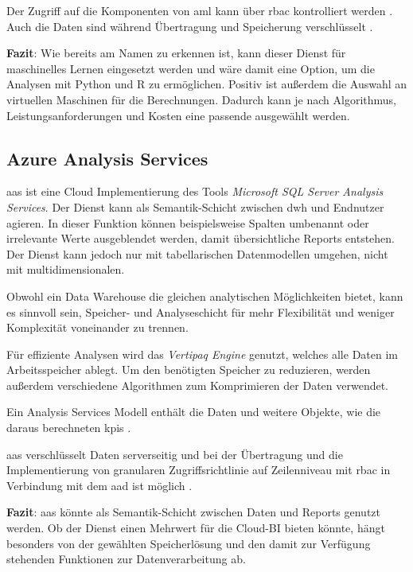 Der Zugriff auf die Komponenten von \ac{aml} kann über \ac{rbac} kontrolliert werden \cite{wu_manage_2021}. Auch die Daten sind während Übertragung und Speicherung verschlüsselt \cite{hirono_data_2021}.

\textbf{Fazit}: Wie bereits am Namen zu erkennen ist, kann dieser Dienst für maschinelles Lernen eingesetzt werden und wäre damit eine Option, um die Analysen mit Python und R zu ermöglichen. Positiv ist außerdem die Auswahl an virtuellen Maschinen für die Berechnungen. Dadurch kann je nach Algorithmus, Leistungsanforderungen und Kosten eine passende ausgewählt werden. 

\subsection{Azure Analysis Services} \label{sec:grundlagen:azure_dienste:analysisServices}
\ac{aas} ist eine Cloud Implementierung des Tools \textit{Microsoft SQL Server Analysis Services}. Der Dienst kann als Semantik-Schicht zwischen \ac{dwh} und Endnutzer agieren. In dieser Funktion können beispielsweise Spalten umbenannt oder irrelevante Werte ausgeblendet werden, damit übersichtliche Reports entstehen. Der Dienst kann jedoch nur mit tabellarischen Datenmodellen umgehen, nicht mit multidimensionalen.

Obwohl ein Data Warehouse die gleichen analytischen Möglichkeiten bietet, kann es sinnvoll sein, Speicher- und Analyseschicht für mehr Flexibilität und weniger Komplexität voneinander zu trennen.

Für effiziente Analysen wird das \textit{Vertipaq Engine} genutzt, welches alle Daten im Arbeitsspeicher ablegt. Um den benötigten Speicher zu reduzieren, werden außerdem verschiedene Algorithmen zum Komprimieren der Daten verwendet.

Ein Analysis Services Modell enthält die Daten und weitere Objekte, wie die daraus berechneten \acp{kpi} \cite{how_beyond_2020}.

\ac{aas} verschlüsselt Daten serverseitig und bei der Übertragung und die Implementierung von granularen Zugriffsrichtlinie auf Zeilenniveau mit \ac{rbac} in Verbindung mit dem \ac{aad} ist möglich \cite{duncan_what_2021}.

\textbf{Fazit}: \ac{aas} könnte als Semantik-Schicht zwischen Daten und Reports genutzt werden. Ob der Dienst einen Mehrwert für die Cloud-BI bieten könnte, hängt besonders von der gewählten Speicherlösung und den damit zur Verfügung stehenden Funktionen zur Datenverarbeitung ab.


